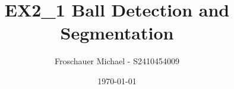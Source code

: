 \documentclass[12pt]{article}
\begin{document}


%
\begin{titlepage}
	\title{EX2\_1 Ball Detection and Segmentation} 
	\author{Froschauer Michael - S2410454009} 
	\date{\today} 
	\maketitle
	\thispagestyle{empty}
	\newpage
\end{titlepage}






\end{document}
